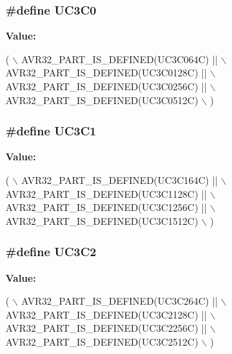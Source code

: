 \subsubsection[{U\+C3\+C0}]{\setlength{\rightskip}{0pt plus 5cm}\#define U\+C3\+C0}\label{group__uc3__part__macros__group_ga4519bacce7868e73227b94af6e2a1b7f}
{\bfseries Value\+:}
\begin{DoxyCode}
(   \(\backslash\)
        AVR32\_PART\_IS\_DEFINED(UC3C064C)  || \(\backslash\)
        AVR32\_PART\_IS\_DEFINED(UC3C0128C) || \(\backslash\)
        AVR32\_PART\_IS\_DEFINED(UC3C0256C) || \(\backslash\)
        AVR32\_PART\_IS\_DEFINED(UC3C0512C) \(\backslash\)
        )
\end{DoxyCode}
\hypertarget{group__uc3__part__macros__group_ga775cb0ff401f59a6062a4513ce6a65e6}{}
\subsubsection[{U\+C3\+C1}]{\setlength{\rightskip}{0pt plus 5cm}\#define U\+C3\+C1}\label{group__uc3__part__macros__group_ga775cb0ff401f59a6062a4513ce6a65e6}
{\bfseries Value\+:}
\begin{DoxyCode}
(   \(\backslash\)
        AVR32\_PART\_IS\_DEFINED(UC3C164C)  || \(\backslash\)
        AVR32\_PART\_IS\_DEFINED(UC3C1128C) || \(\backslash\)
        AVR32\_PART\_IS\_DEFINED(UC3C1256C) || \(\backslash\)
        AVR32\_PART\_IS\_DEFINED(UC3C1512C) \(\backslash\)
        )
\end{DoxyCode}
\hypertarget{group__uc3__part__macros__group_ga74bddd178c8022709acca0ad80ff4db8}{}
\subsubsection[{U\+C3\+C2}]{\setlength{\rightskip}{0pt plus 5cm}\#define U\+C3\+C2}\label{group__uc3__part__macros__group_ga74bddd178c8022709acca0ad80ff4db8}
{\bfseries Value\+:}
\begin{DoxyCode}
(   \(\backslash\)
        AVR32\_PART\_IS\_DEFINED(UC3C264C)  || \(\backslash\)
        AVR32\_PART\_IS\_DEFINED(UC3C2128C) || \(\backslash\)
        AVR32\_PART\_IS\_DEFINED(UC3C2256C) || \(\backslash\)
        AVR32\_PART\_IS\_DEFINED(UC3C2512C) \(\backslash\)
        )
\end{DoxyCode}
\hypertarget{group__uc3__part__macros__group_ga351a876f40669641e6ba9620909143d3}{}
